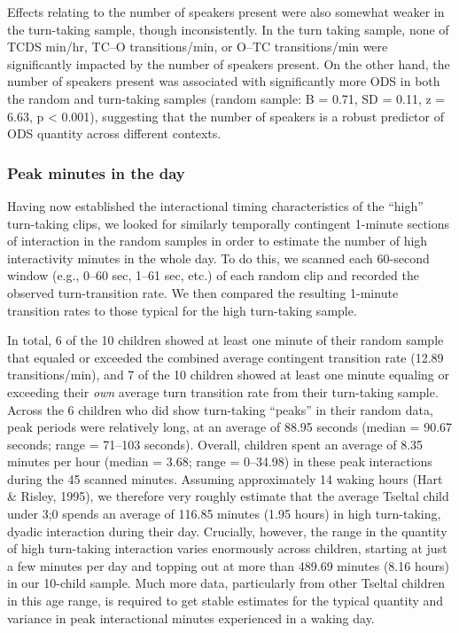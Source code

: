 \documentclass[floatsintext,man]{apa6}
\theoremstyle{definition}
\theoremstyle{definition}
\theoremstyle{definition}
\theoremstyle{remark}
\begin{document}
Effects relating to the number of speakers present were also somewhat
weaker in the turn-taking sample, though inconsistently. In the turn
taking sample, none of TCDS min/hr, TC--O transitions/min, or O--TC
transitions/min were significantly impacted by the number of speakers
present. On the other hand, the number of speakers present was
associated with significantly more ODS in both the random and
turn-taking samples (random sample: B = 0.71, SD = 0.11, z = 6.63, p
\textless{} 0.001), suggesting that the number of speakers is a robust
predictor of ODS quantity across different contexts.

\subsubsection{Peak minutes in the day}\label{peak-minutes-in-the-day}

Having now established the interactional timing characteristics of the
\enquote{high} turn-taking clips, we looked for similarly temporally
contingent 1-minute sections of interaction in the random samples in
order to estimate the number of high interactivity minutes in the whole
day. To do this, we scanned each 60-second window (e.g., 0--60 sec,
1--61 sec, etc.) of each random clip and recorded the observed
turn-transition rate. We then compared the resulting 1-minute transition
rates to those typical for the high turn-taking sample.

In total, 6 of the 10 children showed at least one minute of their
random sample that equaled or exceeded the combined average contingent
transition rate (12.89 transitions/min), and 7 of the 10 children showed
at least one minute equaling or exceeding their \emph{own} average turn
transition rate from their turn-taking sample. Across the 6 children who
did show turn-taking \enquote{peaks} in their random data, peak periods
were relatively long, at an average of 88.95 seconds (median = 90.67
seconds; range = 71--103 seconds). Overall, children spent an average of
8.35 minutes per hour (median = 3.68; range = 0--34.98) in these peak
interactions during the 45 scanned minutes. Assuming approximately 14
waking hours (Hart \& Risley, 1995), we therefore very roughly estimate
that the average Tseltal child under 3;0 spends an average of 116.85
minutes (1.95 hours) in high turn-taking, dyadic interaction during
their day. Crucially, however, the range in the quantity of high
turn-taking interaction varies enormously across children, starting at
just a few minutes per day and topping out at more than 489.69 minutes
(8.16 hours) in our 10-child sample. Much more data, particularly from
other Tseltal children in this age range, is required to get stable
estimates for the typical quantity and variance in peak interactional
minutes experienced in a waking day.
\end{document}
